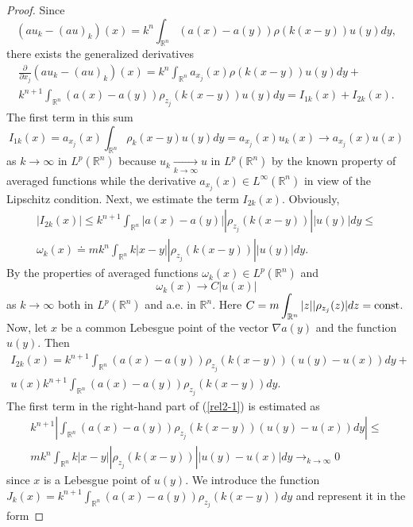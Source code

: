 \documentclass[12pt]{article}
\newcommand{\R}{{\mathbb R}}
\newcommand{\const}{{\rm const}}
\numberwithin{equation}{section}
\theoremstyle{plain}
\theoremstyle{definition}
\begin{document}
\begin{proof}
Since \[(au_k-(au)_k)(x)=k^n\int_{\R^n}(a(x)-a(y))\rho(k(x-y)) u(y)dy,\]
there exists the generalized derivatives
\begin{align}\label{rel}
\frac{\partial}{\partial x_j}(au_k-(au)_k)(x)=k^n\int_{\R^n}a_{x_j}(x)\rho(k(x-y)) u(y)dy+\nonumber\\ k^{n+1}\int_{\R^n}(a(x)-a(y))\rho_{z_j}(k(x-y)) u(y)dy=I_{1k}(x)+I_{2k}(x).
\end{align}
The first term in this sum
\begin{equation}\label{rel1}
I_{1k}(x)=a_{x_j}(x)\int_{\R^n}\rho_k(x-y) u(y)dy=a_{x_j}(x)u_k(x)\to a_{x_j}(x)u(x)
\end{equation}
as $k\to\infty$ in $L^p(\R^n)$ because $u_k\mathop{\to}\limits_{k\to\infty} u$ in $L^p(\R^n)$ by the known property of averaged functions while the derivative $a_{x_j}(x)\in L^\infty(\R^n)$ in view of the Lipschitz condition.
Next, we estimate the term $I_{2k}(x)$. Obviously,
\begin{align}\label{es1}
|I_{2k}(x)|\le k^{n+1}\int_{\R^n}|a(x)-a(y)||\rho_{z_j}(k(x-y))| |u(y)|dy\le \nonumber\\ \omega_k(x)\doteq mk^n\int_{\R^n}k|x-y||\rho_{z_j}(k(x-y))| |u(y)|dy.
\end{align}
By the properties of averaged functions $\omega_k(x)\in L^p(\R^n)$ and
\begin{equation}\label{rel2}
\omega_k(x)\to C|u(x)|
\end{equation}
as $k\to\infty$ both in $L^p(\R^n)$ and a.e. in $\R^n$. Here $\displaystyle C=m\int_{\R^n} |z||\rho_{z_j}(z)|dz=\const$.
Now, let $x$ be a common Lebesgue point of the vector $\nabla a(y)$ and the function $u(y)$. Then
\begin{align}\label{rel2-1}
I_{2k}(x)=k^{n+1}\int_{\R^n}(a(x)-a(y))\rho_{z_j}(k(x-y))(u(y)-u(x))dy+\nonumber\\ u(x)k^{n+1}\int_{\R^n}(a(x)-a(y))\rho_{z_j}(k(x-y))dy.
\end{align}
The first term in the right-hand part of (\ref{rel2-1}) is estimated as
\begin{align}\label{est2-1}
k^{n+1}\left|\int_{\R^n}(a(x)-a(y))\rho_{z_j}(k(x-y))(u(y)-u(x))dy\right|\le \nonumber\\
mk^n\int_{\R^n}k|x-y||\rho_{z_j}(k(x-y))||u(y)-u(x)|dy\mathop{\to}_{k\to\infty} 0
\end{align}
since $x$ is a Lebesgue point of $u(y)$. We introduce the function ${\displaystyle J_k(x)=k^{n+1}\int_{\R^n}(a(x)-a(y))\rho_{z_j}(k(x-y))dy}$ and represent it in the form

\end{proof}
\end{document}
